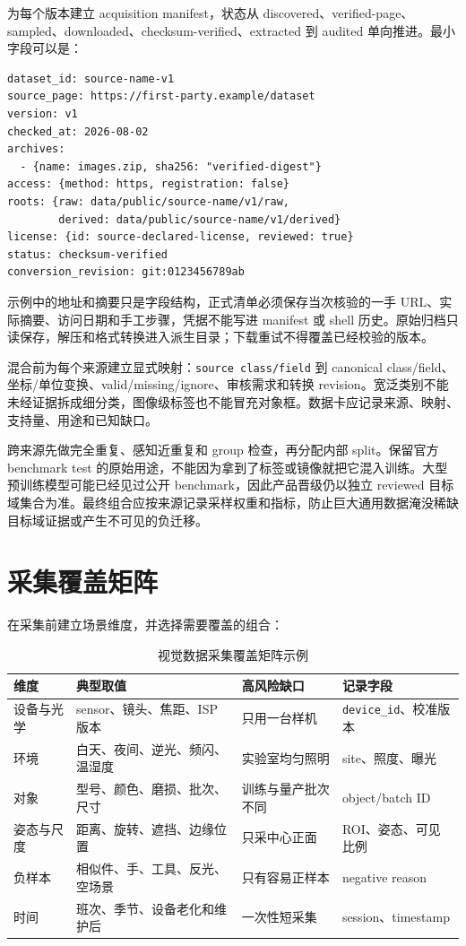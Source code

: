 为每个版本建立 acquisition manifest，状态从 discovered、verified-page、sampled、downloaded、checksum-verified、extracted 到 audited 单向推进。最小字段可以是：

\begin{lstlisting}[caption={公开数据集 acquisition manifest 字段示意}]
dataset_id: source-name-v1
source_page: https://first-party.example/dataset
version: v1
checked_at: 2026-08-02
archives:
  - {name: images.zip, sha256: "verified-digest"}
access: {method: https, registration: false}
roots: {raw: data/public/source-name/v1/raw,
        derived: data/public/source-name/v1/derived}
license: {id: source-declared-license, reviewed: true}
status: checksum-verified
conversion_revision: git:0123456789ab
\end{lstlisting}

示例中的地址和摘要只是字段结构，正式清单必须保存当次核验的一手 URL、实际摘要、访问日期和手工步骤，凭据不能写进 manifest 或 shell 历史。原始归档只读保存，解压和格式转换进入派生目录；下载重试不得覆盖已经校验的版本。

混合前为每个来源建立显式映射：\texttt{source class/field} 到 canonical class/field、坐标/单位变换、valid/missing/ignore、审核需求和转换 revision。宽泛类别不能未经证据拆成细分类，图像级标签也不能冒充对象框。数据卡应记录来源、映射、支持量、用途和已知缺口\cite{datasheets-for-datasets}。

跨来源先做完全重复、感知近重复和 group 检查，再分配内部 split。保留官方 benchmark test 的原始用途，不能因为拿到了标签或镜像就把它混入训练。大型预训练模型可能已经见过公开 benchmark，因此产品晋级仍以独立 reviewed 目标域集合为准。最终组合应按来源记录采样权重和指标，防止巨大通用数据淹没稀缺目标域证据或产生不可见的负迁移。

\section{采集覆盖矩阵}

在采集前建立场景维度，并选择需要覆盖的组合：

\begin{table}[H]
  \centering
  \caption{视觉数据采集覆盖矩阵示例}
  \begin{tabular}{p{24mm}p{45mm}p{43mm}p{25mm}}
    \hline
    维度 & 典型取值 & 高风险缺口 & 记录字段 \\
    \hline
    设备与光学 & sensor、镜头、焦距、ISP 版本 & 只用一台样机 & \texttt{device\_id}、校准版本 \\
    环境 & 白天、夜间、逆光、频闪、温湿度 & 实验室均匀照明 & site、照度、曝光 \\
    对象 & 型号、颜色、磨损、批次、尺寸 & 训练与量产批次不同 & object/batch ID \\
    姿态与尺度 & 距离、旋转、遮挡、边缘位置 & 只采中心正面 & ROI、姿态、可见比例 \\
    负样本 & 相似件、手、工具、反光、空场景 & 只有容易正样本 & negative reason \\
    时间 & 班次、季节、设备老化和维护后 & 一次性短采集 & session、timestamp \\
    \hline
  \end{tabular}
\end{table}

